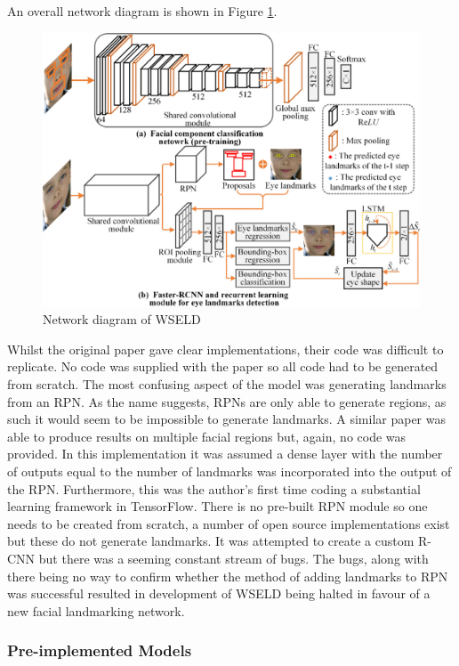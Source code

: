 An overall network diagram is shown in Figure \ref{fig:wseld}.

\begin{figure}[h]
    \centering
    \includegraphics[width=0.75\linewidth]{dissertation//figures/wseld.jpg}
    \caption{Network diagram of WSELD\cite{huang2020eye}}
    \label{fig:wseld}
\end{figure}

Whilst the original paper gave clear implementations, their code was difficult to replicate. No code was supplied with the paper so all code had to be generated from scratch. The most confusing aspect of the model was generating landmarks from an RPN. As the name suggests, RPNs are only able to generate regions, as such it would seem to be impossible to generate landmarks. A similar paper was able to produce results on multiple facial regions\cite{tang2018facial} but, again, no code was provided. In this implementation it was assumed a dense layer with the number of outputs equal to the number of landmarks was incorporated into the output of the RPN. Furthermore, this was the author's first time coding a substantial learning framework in TensorFlow. There is no pre-built RPN module so one needs to be created from scratch, a number of open source implementations exist\cite{hxuaj2021tensorflow2}\cite{kewar2021region} but these do not generate landmarks. It was attempted to create a custom R-CNN but there was a seeming constant stream of bugs. The bugs, along with there being no way to confirm whether the method of adding landmarks to RPN was successful resulted in development of WSELD being halted in favour of a new facial landmarking network.

\subsubsection{Pre-implemented Models}

